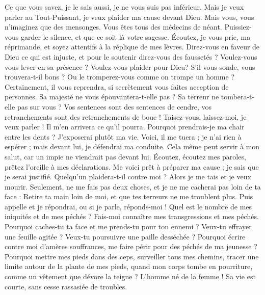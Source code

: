 \begin{multicols}{2}
Ce que vous savez, je le sais aussi, je ne vous suis pas inférieur.
Mais je veux parler au Tout-Puissant, je veux plaider ma cause devant Dieu.
Mais vous, vous n'imaginez que des mensonges. Vous êtes tous des médecins de néant.
Puissiez-vous garder le silence, et que ce soit là votre sagesse.
Écoutez, je vous prie, ma réprimande, et soyez attentifs à la réplique de mes lèvres.
Direz-vous en faveur de Dieu ce qui est injuste, et pour le soutenir direz-vous des faussetés ?
Voulez-vous vous lever en sa présence ? Voulez-vous plaider pour Dieu?
S'il vous sonde, vous trouvera-t-il bons ? Ou le tromperez-vous comme on trompe un homme ?
Certainement, il vous reprendra, si secrètement vous faites acception de personnes.
Sa majesté ne vous épouvantera-t-elle pas ? Sa terreur ne tombera-t-elle pas sur vous ?
Vos sentences sont des sentences de cendre, vos retranchements sont des retranchements de boue !
Taisez-vous, laissez-moi, je veux parler ! Il m'en arrivera ce qu'il pourra.
Pourquoi prendrais-je ma chair entre les dents ? J'exposerai plutôt ma vie.
Voici, il me tuera ; je n'ai rien à espérer ; mais devant lui, je défendrai ma conduite.
Cela même peut servir à mon salut, car un impie ne viendrait pas devant lui.
Écoutez, écoutez mes paroles, prêtez l'oreille à mes déclarations.
Me voici prêt à préparer ma cause ; je sais que je serai justifié.
Quelqu'un plaidera-t-il contre moi ? Alors je me tais et je veux mourir.
Seulement, ne me fais pas deux choses, et je ne me cacherai pas loin de ta face :
Retire ta main loin de moi, et que tes terreurs ne me troublent plus.
Puis appelle et je répondrai, ou si je parle, réponds-moi !
Quel est le nombre de mes iniquités et de mes péchés ? Fais-moi connaître mes transgressions et mes péchés.
Pourquoi caches-tu ta face et me prends-tu pour ton ennemi ?
Veux-tu effrayer une feuille agitée ? Veux-tu poursuivre une paille desséchée ?
Pourquoi écrire contre moi d'amères souffrances, me faire périr pour des péchés de ma jeunesse ?
Pourquoi mettre mes pieds dans des ceps, surveiller tous mes chemins, tracer une limite autour de la plante de mes pieds,
quand mon corps tombe en pourriture, comme un vêtement que dévore la teigne ?
\VerseOne{}L'homme né de la femme ! Sa vie est courte, sans cesse rassasiée de troubles.

\end{multicols}
